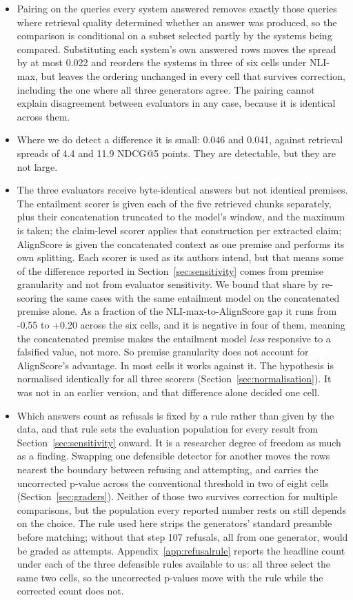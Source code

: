 \documentclass[11pt]{article}
\begin{document}
\begin{itemize}
\item Pairing on the queries every system answered removes exactly those queries where retrieval quality determined whether an answer was produced, so the comparison is conditional on a subset selected partly by the systems being compared. Substituting each system's own answered rows moves the spread by at most 0.022 and reorders the systems in three of six cells under NLI-max, but leaves the ordering unchanged in every cell that survives correction, including the one where all three generators agree. The pairing cannot explain disagreement between evaluators in any case, because it is identical across them.
\item Where we do detect a difference it is small: 0.046 and 0.041, against retrieval spreads of 4.4 and 11.9 NDCG@5 points. They are detectable, but they are not large.
\item The three evaluators receive byte-identical answers but not identical premises. The entailment scorer is given each of the five retrieved chunks separately, plus their concatenation truncated to the model's window, and the maximum is taken; the claim-level scorer applies that construction per extracted claim; AlignScore is given the concatenated context as one premise and performs its own splitting. Each scorer is used as its authors intend, but that means some of the difference reported in Section~\ref{sec:sensitivity} comes from premise granularity and not from evaluator sensitivity. We bound that share by re-scoring the same cases with the same entailment model on the concatenated premise alone. As a fraction of the NLI-max-to-AlignScore gap it runs from -0.55 to +0.20 across the six cells, and it is negative in four of them, meaning the concatenated premise makes the entailment model \emph{less} responsive to a falsified value, not more. So premise granularity does not account for AlignScore's advantage. In most cells it works against it. The hypothesis is normalised identically for all three scorers (Section~\ref{sec:normalisation}). It was not in an earlier version, and that difference alone decided one cell.
\item Which answers count as refusals is fixed by a rule rather than given by the data, and that rule sets the evaluation population for every result from Section~\ref{sec:sensitivity} onward. It is a researcher degree of freedom as much as a finding. Swapping one defensible detector for another moves the rows nearest the boundary between refusing and attempting, and carries the uncorrected p-value across the conventional threshold in two of eight cells (Section~\ref{sec:graders}). Neither of those two survives correction for multiple comparisons, but the population every reported number rests on still depends on the choice. The rule used here strips the generators' standard preamble before matching; without that step 107 refusals, all from one generator, would be graded as attempts. Appendix~\ref{app:refusalrule} reports the headline count under each of the three defensible rules available to us: all three select the same two cells, so the uncorrected p-values move with the rule while the corrected count does not.

\end{itemize}
\end{document}
